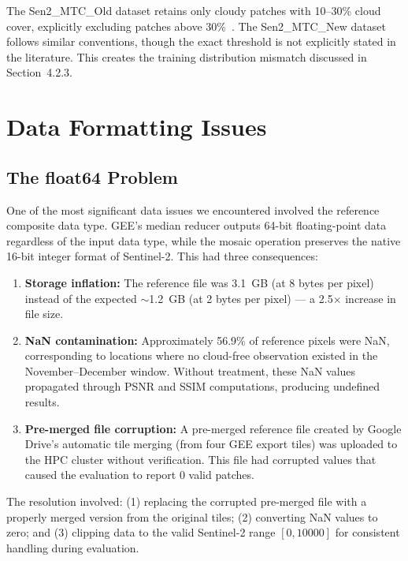 \documentclass[12pt,a4paper]{article}
\begin{document}
The Sen2\_MTC\_Old dataset retains only cloudy patches with 10--30\% cloud cover, explicitly excluding patches above 30\%~\cite{sarukkai2020cloud}. The Sen2\_MTC\_New dataset follows similar conventions, though the exact threshold is not explicitly stated in the literature. This creates the training distribution mismatch discussed in Section~4.2.3.



\section{Data Formatting Issues}

\subsection{The float64 Problem}

One of the most significant data issues we encountered involved the reference composite data type. GEE's median reducer outputs 64-bit floating-point data regardless of the input data type, while the mosaic operation preserves the native 16-bit integer format of Sentinel-2. This had three consequences:

\begin{enumerate}[leftmargin=2em]
    \item \textbf{Storage inflation:} The reference file was 3.1~GB (at 8 bytes per pixel) instead of the expected ${\sim}$1.2~GB (at 2 bytes per pixel) --- a 2.5$\times$ increase in file size.
    
    \item \textbf{NaN contamination:} Approximately 56.9\% of reference pixels were NaN, corresponding to locations where no cloud-free observation existed in the November--December window. Without treatment, these NaN values propagated through PSNR and SSIM computations, producing undefined results.
    
    \item \textbf{Pre-merged file corruption:} A pre-merged reference file created by Google Drive's automatic tile merging (from four GEE export tiles) was uploaded to the HPC cluster without verification. This file had corrupted values that caused the evaluation to report 0 valid patches.
\end{enumerate}

The resolution involved: (1) replacing the corrupted pre-merged file with a properly merged version from the original tiles; (2) converting NaN values to zero; and (3) clipping data to the valid Sentinel-2 range $[0, 10000]$ for consistent handling during evaluation.
\end{document}
